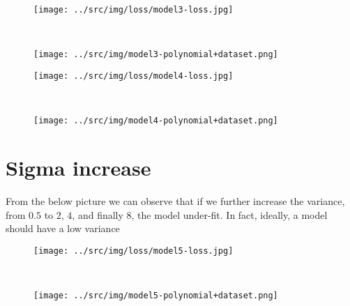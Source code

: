 \documentclass[a4paper,12pt]{article} %
\begin{document}
	\begin{figure}[H]
		\begin{minipage}[t]{.5\textwidth}
			\centering
			\texttt{[image: ../src/img/loss/model3-loss.jpg]}
			\label{fig:model3-loss}
		\end{minipage}
		~
		\begin{minipage}[t]{.5\textwidth}
			\centering
			\texttt{[image: ../src/img/model3-polynomial+dataset.png]}
			\label{fig:model3-polynomial+dataset}
		\end{minipage}
	\end{figure}
	
	\begin{figure}[H]
		\begin{minipage}[t]{.5\textwidth}
			\centering
			\texttt{[image: ../src/img/loss/model4-loss.jpg]}
			\label{fig:model4-loss}
		\end{minipage}
		~
		\begin{minipage}[t]{.5\textwidth}
			\centering
			\texttt{[image: ../src/img/model4-polynomial+dataset.png]}
			\label{fig:model4-polynomial+dataset}
		\end{minipage}
	\end{figure}
	
	\section{Sigma increase}
	
	
	From the below picture we can observe that if we further increase the 
	variance, from $0.5$ to $2$, $4$, and finally $8$, the model under-fit.
	In fact, ideally, a model should have a low variance

	
	\begin{figure}[H]
		\begin{minipage}[t]{.5\textwidth}
			\centering
			\texttt{[image: ../src/img/loss/model5-loss.jpg]}
			\label{fig:model5-loss}
		\end{minipage}
		~
		\begin{minipage}[t]{.5\textwidth}
			\centering
			\texttt{[image: ../src/img/model5-polynomial+dataset.png]}
			\label{fig:model5-polynomial+dataset}
		\end{minipage}
	\end{figure}
	
\end{document}
